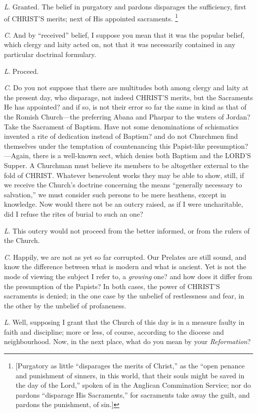 \emph{L}. Granted. The belief in purgatory and
pardons disparages the sufficiency, first of CHRIST'S
merits; next of His appointed sacraments. \footnote{[Purgatory as little ``disparages the merits of Christ,'' as the ``open
penance and punishment of sinners, in this world, that their souls
might be saved in the day of the Lord,'' spoken of in the Anglican
Commination Service; nor do pardons ``disparage His Sacraments,'' for
sacraments take away the guilt, and pardons the punishment, of sin.]}

\emph{C}. And by ``received'' belief, I suppose you
mean that it was the popular belief, which clergy and laity acted on,
not that it was necessarily contained in any particular doctrinal
formulary.

\emph{L}. Proceed.

\emph{C}. Do you not suppose that there are
multitudes both among clergy and laity at the present day, who
disparage, not indeed CHRIST'S
merits, but the Sacraments He has appointed? and if so, is not their
error so far the same in kind as that of the Romish Church—the
preferring Abana and Pharpar to the waters of Jordan? Take the
Sacrament of Baptism. Have not some denominations of schismatics
invented a rite of dedication instead of Baptism? and do not Churchmen
find themselves under the temptation of countenancing this Papist-like
presumption?—Again, there is a well-known sect, which denies both
Baptism and the LORD'S Supper. A
Churchman must believe its members to be altogether external to the
fold of CHRIST. Whatever
benevolent works they may be able to show, still, if we receive the
Church's doctrine concerning the means ``generally necessary to
salvation,'' we must consider such persons to be mere heathens,
except in knowledge. Now would there not be an outcry raised, as if I
were uncharitable, did I refuse the rites of burial to such an one?

\emph{L}. This outcry would not proceed from the
better informed, or from the rulers of the Church.

\emph{C}. Happily, we are not as yet so far
corrupted. Our Prelates are still sound, and know the difference
between what is modern and what is ancient. Yet is not the mode of
viewing the subject I refer to, a \emph{growing} one? and how does it
differ from the presumption of the Papists? In both cases, the power
of CHRIST'S sacraments is
denied; in the one case by the unbelief of restlessness and fear, in
the other by the unbelief of profaneness.

\emph{L}. Well, supposing I grant that the Church
of this day is in a measure faulty in faith and discipline; more or
less, of course, according to the diocese and neighbourhood. Now, in
the next place, what do you mean by your \emph{Reformation}?

